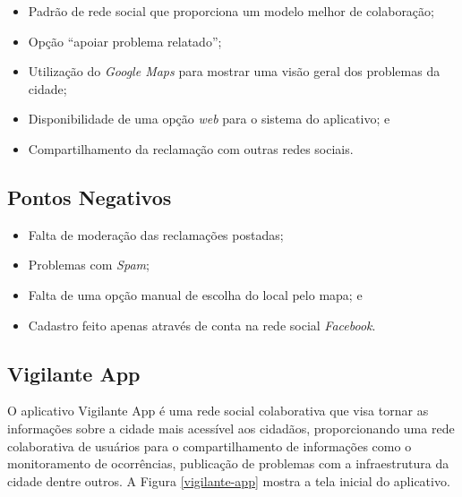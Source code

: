 \begin{itemize}
    \item Padrão de rede social que proporciona um modelo melhor de colaboração;
    \item Opção ``apoiar problema relatado'';
    \item Utilização do \textit{Google Maps} para mostrar uma visão geral dos problemas da cidade;
    \item Disponibilidade de uma opção \textit{web} para o sistema do aplicativo; e
    \item Compartilhamento da reclamação com outras redes sociais.
\end{itemize}

\subsection*{Pontos Negativos}

\begin{itemize}
    \item Falta de moderação das reclamações postadas;
    \item Problemas com \textit{Spam};
    \item Falta de uma opção manual de escolha do local pelo mapa; e
    \item Cadastro feito apenas através de conta na rede social \textit{Facebook}.
\end{itemize}

\subsection{Vigilante App}

\noindent O aplicativo Vigilante App \cite{vigilante_app} é uma rede social colaborativa que visa tornar as informações sobre a cidade mais acessível aos cidadãos, proporcionando uma rede colaborativa de usuários para o compartilhamento de informações como o monitoramento de ocorrências, publicação de problemas com a infraestrutura da cidade dentre outros. A Figura \ref{vigilante-app} mostra a tela inicial do aplicativo.

